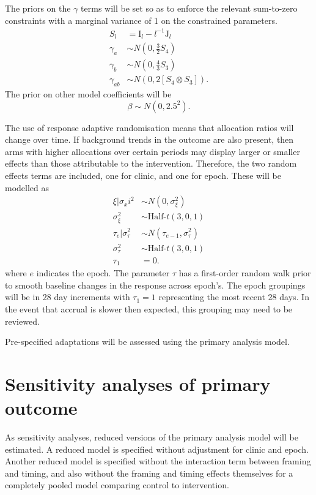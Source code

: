 \documentclass[
  bibliography=totoc]{scrreprt}
\begin{document}
The priors on the \(\gamma\) terms will be set so as to enforce the relevant sum-to-zero constraints with a marginal variance of 1 on the constrained parameters.
\[
\begin{aligned}
S_l &= \mathrm{I}_l - l^{-1}\mathrm{J}_l \\
\gamma_a &\sim N\left(0, \frac{3}{2}S_4\right) \\
\gamma_b &\sim N\left(0, \frac{4}{3}S_3\right) \\
\gamma_{ab} &\sim N\left(0, 2\left[S_4\otimes S_3\right]\right).
\end{aligned}
\]
The prior on other model coefficients will be
\[
\beta \sim N(0, 2.5^2).
\]

The use of response adaptive randomisation means that allocation ratios will change over time.
If background trends in the outcome are also present, then arms with higher allocations over certain periods may display larger or smaller effects than those attributable to the intervention.
Therefore, the two random effects terms are included, one for clinic, and one for epoch.
These will be modelled as
\[
\begin{aligned}
\xi|\sigma_xi^2 &\sim N(0, \sigma^2_\xi) \\
\sigma_\xi^2 &\sim \text{Half-}t(3, 0, 1) \\
\tau_e|\sigma_\tau^2 &\sim N(\tau_{e-1}, \sigma_\tau^2) \\
\sigma_\tau^2 &\sim \text{Half-}t(3, 0, 1) \\
\tau_1 &= 0.
\end{aligned}
\]
where \(e\) indicates the epoch.
The parameter \(\tau\) has a first-order random walk prior to smooth baseline changes in the response across epoch's.
The epoch groupings will be in 28 day increments with \(\tau_1=1\) representing the most recent 28 days.
In the event that accrual is slower then expected, this grouping may need to be reviewed.

Pre-specified adaptations will be assessed using the primary analysis model.

\hypertarget{sensitivity-analyses-of-primary-outcome}{%
\section{Sensitivity analyses of primary outcome}\label{sensitivity-analyses-of-primary-outcome}}

As sensitivity analyses, reduced versions of the primary analysis model will be estimated.
A reduced model is specified without adjustment for clinic and epoch.
Another reduced model is specified without the interaction term between framing and timing, and also without the framing and timing effects themselves for a completely pooled model comparing control to intervention.
\end{document}
